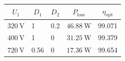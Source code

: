 
\begin{solutiontable}[ht]
	\centering  %
	\begin{tabular}{lllll}
		\toprule
		\multicolumn{1}{c}{$U_\mathrm{1}$} & \multicolumn{1}{c}{$D_1$}             &
		\multicolumn{1}{c}{$D_2$}          & \multicolumn{1}{c}{$P_\mathrm{loss}$} &
		\multicolumn{1}{c}{$\eta_\mathrm{opt}$}                                                                         \\
		\midrule
		$\SI{320}{\volt}$                  & 1                                     & 0.2 & $\SI{46.88}{\watt}$ & 99.071 \\
		$\SI{400}{\volt}$                  & 1                                     & 0   & $\SI{31.25}{\watt}$ & 99.379 \\
		$\SI{720}{\volt}$                  & 0.56                                  & 0   & $\SI{17.36}{\watt}$ & 99.654 \\
		\bottomrule
	\end{tabular}
	\caption{Duty cycles, power loss and $\eta_\mathrm{opt}$ as fct. of $U_\mathrm{1}$.}
	\label{table:PowerlossDutyCycleEfficiencyOpt}
\end{solutiontable}